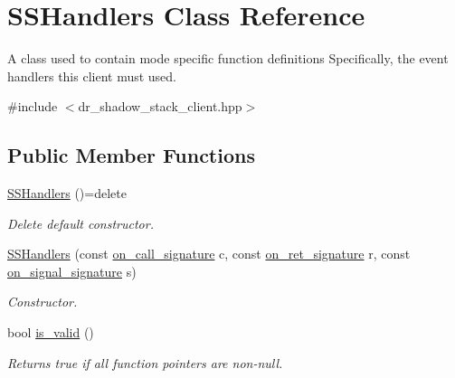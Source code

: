 \hypertarget{class_s_s_handlers}{}\section{S\+S\+Handlers Class Reference}
\label{class_s_s_handlers}


A class used to contain mode specific function definitions Specifically, the event handlers this client must used.  




{\ttfamily \#include $<$dr\+\_\+shadow\+\_\+stack\+\_\+client.\+hpp$>$}

\subsection*{Public Member Functions}
\begin{DoxyCompactItemize}
\item 
\hyperlink{class_s_s_handlers_aa6983716a948c14c3bd9de8449b418fc}{S\+S\+Handlers} ()=delete
\begin{DoxyCompactList}\small\item\em Delete default constructor. \end{DoxyCompactList}\item 
\hyperlink{class_s_s_handlers_a58d41cd44d4d7a9eb32592ec7b387024}{S\+S\+Handlers} (const \hyperlink{class_s_s_handlers_aa202bfb2f7c6236c0f1ee6f61d366487}{on\+\_\+call\+\_\+signature} c, const \hyperlink{class_s_s_handlers_a0aff437ef4f59faacb14bb1fb55e214c}{on\+\_\+ret\+\_\+signature} r, const \hyperlink{class_s_s_handlers_a7b77d0dda29c2fe22e6aeddd4807387f}{on\+\_\+signal\+\_\+signature} s)
\begin{DoxyCompactList}\small\item\em Constructor. \end{DoxyCompactList}\item 
bool \hyperlink{class_s_s_handlers_a05e004a25c6cd0bcf0b1958ddf1799a4}{is\+\_\+valid} ()
\begin{DoxyCompactList}\small\item\em Returns true if all function pointers are non-\/null. \end{DoxyCompactList}\end{DoxyCompactItemize}
